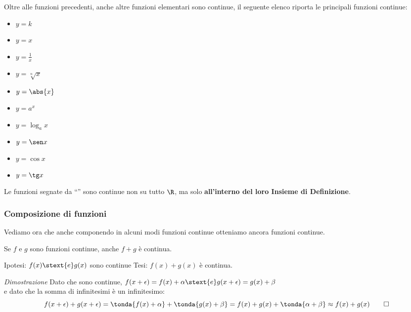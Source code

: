 \noindent\begin{minipage}{\textwidth}
Oltre alle funzioni precedenti, anche altre funzioni elementari sono 
continue, il seguente elenco riporta le principali funzioni continue:

\noindent\begin{minipage}{1.05\textwidth}
\begin{multicols}{5}
\begin{itemize} [noitemsep]
 \item \(y=k\)
 \item \(y=x\)
 \item \(y=\frac{1}{x}\)  \textasteriskcentered
 \item \(y=\sqrt[n]{x}\)  \textasteriskcentered
 \item \(y=\abs{x}\)
 \item \(y=a^x\)
 \item \(y=\log_a x\)  \textasteriskcentered
 \item \(y=\sen x\)
 \item \(y=\cos x\)
 \item \(y=\tg x\)  \textasteriskcentered
\end{itemize}
\end{multicols}
\end{minipage}

\begin{osservazione}
Le funzioni segnate da ``\textasteriskcentered'' sono continue non su 
tutto \(\R\), 
ma solo \textbf{all'interno del loro Insieme di Definizione}.
\end{osservazione}
\end{minipage}

\subsubsection{Composizione di funzioni}
\label{subsubsec:cont_composizionefunzioni}

Vediamo ora che anche componendo in alcuni modi funzioni continue otteniamo 
ancora funzioni continue.

\begin{teorema}
Se \(f\) e \(g\) sono funzioni continue, anche \(f+g\) è continua.
\end{teorema}

\noindent Ipotesi: 
\(f(x) \stext{e} g(x)\) sono continue
\tab Tesi: 
\(f(x)+g(x)\) è continua.

\emph{Dimostrazione}
Dato che sono continue, 
\(f(x+\epsilon) = f(x)+\alpha \stext{ e } g(x+\epsilon) = g(x)+\beta\) \\
e dato che la somma di infinitesimi è un infinitesimo:
\[f(x+\epsilon) + g(x+\epsilon) = 
\tonda{f(x)+\alpha} + \tonda{g(x)+\beta} = 
f(x)+g(x)+\tonda{\alpha + \beta} \approx f(x)+g(x) \qed\]

